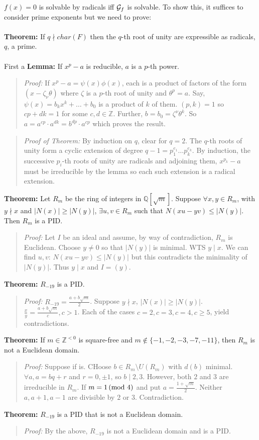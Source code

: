 $f(x)=0$ is solvable by radicals iff ${\cal G}_f$ is solvable.  To show this,
it suffices to consider prime exponents but we need
to prove:
\\
\\
{\bf Theorem:} If $q \nmid char(F)$ then the $q$-th root of unity are expressible as radicals, $q$,
a prime.
\\
\\
First a {\bf Lemma:} If $x^p-a$ is reducible, $a$ is a $p$-th power.
\begin{quote}
\emph{Proof:}
If $x^p-a = \psi(x) \phi(x)$, each is a product of factors of the form $(x- \zeta_{\nu} \theta)$ where
$\zeta$ is a $p$-th root of unity and $\theta^p=a$.  Say, $\psi(x)= b_k x^k + \ldots + b_0$ is 
a product of $k$ of them.  $(p,k)=1$ so $cp+dk=1$ for some $c, d \in {\mathbb Z}$.  Further,
$b= b_0= \zeta^{\nu} \theta^k$.  So $a=a^{cp} \cdot a^{dk}= b^{dp} \cdot a^{cp}$ which proves
the result.
\end{quote}
\begin{quote}
\emph{Proof of Theorem:}
By induction on $q$, clear for $q=2$.  The $q$-th roots of unity form a cyclic extension of
degree $q-1= p_1^{e_1} \ldots p_k^{e_k}$.  By induction, the successive $p_i$-th roots of unity
are radicals and adjoining them, $x^{p_k}-a$ must be irreducible by the lemma so each such
extension is a radical extension.
\end{quote}
{\bf Theorem:} Let $R_m$ be the ring of integers in ${\mathbb Q}[{\sqrt m}]$.  Suppose
$\forall x, y\in R_m$, with $y \nmid x$ and $|N(x)| \ge |N(y)|$, $\exists u, v \in R_m$ such that
$N(xu-yv) \leq |N(y)|$. Then $R_m$ is a PID.
\begin{quote}
\emph{Proof:} Let $I$ be an ideal and assume, by way of contradiction, $R_m$ is Euclidean.
Choose $y \ne 0$ so that $|N(y)|$ is minimal.  WTS $y \mid x$.  We can find
$u, v$: $N(xu-yv) \leq |N(y)|$ but this contradicts the minimality of $|N(y)|$.  Thus
$y \mid x$ and $I = (y)$.
\end{quote}
{\bf Theorem:} $R_{-19}$ is a PID.
\begin{quote}
\emph{Proof:} $R_{-19} = {\frac {a + b {\sqrt m}} {2}}$.  Suppose $y \nmid x$, $|N(x)| \geq |N(y)|$.
${\frac {x} {y}} = {\frac {a + b {\sqrt m}} {c}}, c > 1$.  Each of the cases $c=2, c=3, c=4, c \geq 5$,
yield contradictions.
\end{quote}
{\bf Theorem:} If $m \in {\mathbb Z}^{<0}$ is square-free and $m \notin \{-1, -2, -3, -7, -11 \}$,
then $R_m$ is not a Euclidean domain.
\begin{quote}
\emph{Proof:}
Suppose if is.  CHoose $b \in R_m \setminus U(R_m)$ with $d(b)$ minimal.
$\forall a, a=bq+r$ and $r =0, \pm  1$, so $b \mid 2, 3$.  However,
both $2$ and $3$ are irreducible in $R_m$.  If $m = 1 \thinspace \textnormal{(mod } 4 \textnormal{)}$ and put $a= {\frac {1 + {\sqrt m}} {2}}$.
Neither $a, a+1, a-1$ are divisible by $2$ or $3$.  Contradiction.
\end{quote}
{\bf Theorem:} $R_{-19}$ is a PID that is not a Euclidean domain.
\begin{quote}
\emph{Proof:}  By the above, $R_{-19}$ is not a Euclidean domain and is a PID.
\end{quote}
